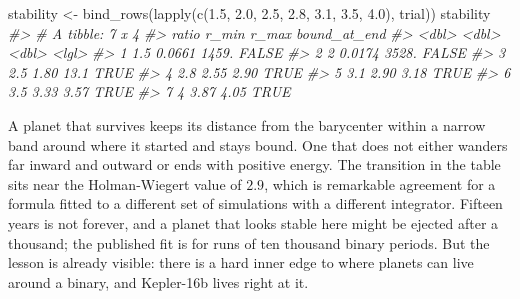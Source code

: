 \documentclass[
  10.5pt,
  letterpaper,
]{scrbook}
\newenvironment{Shaded}{\begin{snugshade}}{\end{snugshade}}
\newcommand{\CommentTok}[1]{\textcolor[rgb]{0.00,0.00,0.00}{\textit{#1}}}
\newcommand{\FloatTok}[1]{\textcolor[rgb]{0.00,0.00,0.00}{#1}}
\newcommand{\FunctionTok}[1]{\textcolor[rgb]{0.00,0.00,0.00}{#1}}
\newcommand{\NormalTok}[1]{\textcolor[rgb]{0.00,0.00,0.00}{#1}}
\newcommand{\OtherTok}[1]{\textcolor[rgb]{0.00,0.00,0.00}{#1}}
\theoremstyle{definition}
\theoremstyle{plain}
\theoremstyle{remark}
\begin{document}
\begin{Shaded}
\begin{Highlighting}[]
\NormalTok{stability }\OtherTok{\textless{}{-}} \FunctionTok{bind\_rows}\NormalTok{(}\FunctionTok{lapply}\NormalTok{(}\FunctionTok{c}\NormalTok{(}\FloatTok{1.5}\NormalTok{, }\FloatTok{2.0}\NormalTok{, }\FloatTok{2.5}\NormalTok{, }\FloatTok{2.8}\NormalTok{, }\FloatTok{3.1}\NormalTok{, }\FloatTok{3.5}\NormalTok{, }\FloatTok{4.0}\NormalTok{), trial))}
\NormalTok{stability}
\CommentTok{\#\textgreater{} \# A tibble: 7 x 4}
\CommentTok{\#\textgreater{}   ratio  r\_min   r\_max bound\_at\_end}
\CommentTok{\#\textgreater{}   \textless{}dbl\textgreater{}  \textless{}dbl\textgreater{}   \textless{}dbl\textgreater{} \textless{}lgl\textgreater{}       }
\CommentTok{\#\textgreater{} 1   1.5 0.0661 1459.   FALSE       }
\CommentTok{\#\textgreater{} 2   2   0.0174 3528.   FALSE       }
\CommentTok{\#\textgreater{} 3   2.5 1.80     13.1  TRUE        }
\CommentTok{\#\textgreater{} 4   2.8 2.55      2.90 TRUE        }
\CommentTok{\#\textgreater{} 5   3.1 2.90      3.18 TRUE        }
\CommentTok{\#\textgreater{} 6   3.5 3.33      3.57 TRUE        }
\CommentTok{\#\textgreater{} 7   4   3.87      4.05 TRUE}
\end{Highlighting}
\end{Shaded}

A planet that survives keeps its distance from the barycenter within a
narrow band around where it started and stays bound. One that does not
either wanders far inward and outward or ends with positive energy. The
transition in the table sits near the Holman-Wiegert value of \(2.9\),
which is remarkable agreement for a formula fitted to a different set of
simulations with a different integrator. Fifteen years is not forever,
and a planet that looks stable here might be ejected after a thousand;
the published fit is for runs of ten thousand binary periods. But the
lesson is already visible: there is a hard inner edge to where planets
can live around a binary, and Kepler-16b lives right at it.
\end{document}

